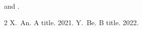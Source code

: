 \documentclass{article}
\begin{document}
\njdforkextra{} \cite{a} and \cite[p.~5]{b}.
\begin{thebibliography}{2}
 X.~An. A title. 2021.
 Y.~Be. B title. 2022.
\end{thebibliography}
\end{document}
